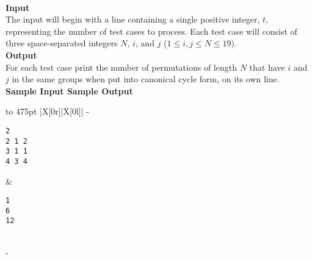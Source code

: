 \documentclass[a4paper,11pt]{article}
\begin{document}
\vspace{7mm}\\
\large{\bf{Input}}\vspace{2mm}\\
The input will begin with a line containing a single positive integer, $t$, representing the number of test cases to process. Each test case will consist of three space-separated integers $N$, $i$, and $j$ ($1 \leq i, j \leq N \leq 19$).
\vspace{3mm}\\
\large{\bf{Output}}\vspace{2mm}\\
For each test case print the number of permutations of length $N$ that have $i$ and $j$ in the same groups when put into canonical cycle form, on its own line.
\vspace{5mm}\\
\bf{Sample Input} \hspace{52mm} \bf{Sample Output}\vspace{1mm}\\
\begin{tabu*} to 475pt {|X[0r]|X[0l]|}
\tabucline-
\vspace{-\baselineskip} %
\begin{Verbatim}
2
2 1 2
3 1 1
4 3 4
\end{Verbatim}
&
\vspace{-\baselineskip} %
\begin{Verbatim}
1
6
12
\end{Verbatim}
\\
\tabucline-
\end{tabu*}
\end{document}
